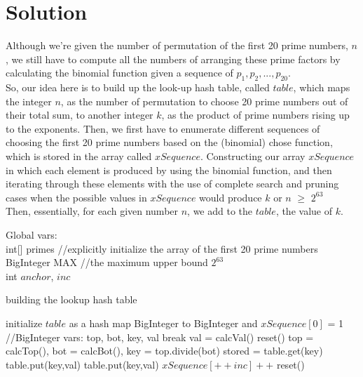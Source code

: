 \documentclass[12pt]{article}
\begin{document}
  \section{Solution}
	Although we're given the number of permutation of the first 20 prime numbers, $n$, we still have to compute all the numbers of arranging these prime factors by calculating the binomial function given a sequence of $p_1, p_2, ... , p_20$. \\
	So, our idea here is to build up the look-up hash table, called $table$, which maps the integer $n$, as the number of permutation to choose 20 prime numbers out of their total sum, to another integer $k$, as the product of prime numbers rising up to the exponents.
	Then, we first have to enumerate different sequences of choosing the first 20 prime numbers based on the (binomial) chose function, which is stored in the array called $xSequence$. Constructing our array $xSequence$  in which each element is produced by using the binomial function, and then iterating through these elements with the use of complete search and pruning cases when the possible values in $xSequence$ would produce $k$ or $n$ $\geq$ $2^{63}$  \\
	Then, essentially, for each given number $n$, we add to the $table$, the value of $k$.

	Global vars: \\
	int[] primes //explicitly initialize the array of the first 20 prime numbers \\
	BigInteger MAX //the maximum upper bound $2^{63}$\\
	int $anchor$, $inc$ \\

\begin{algorithm}[H]
\caption{building the lookup hash table}
\begin{algorithmic}
   	\State initialize $table$ as a hash map BigInteger to BigInteger and $xSequence[0]$ = 1
					//BigInteger vars: top, bot, key, val
			\State break
		\EndIf
			\State val = calcVal()
				\State reset()
			\EndIf
			\State top = calcTop(), bot = calcBot(), key = top.divide(bot)
				\State stored = table.get(key)
					\State table.put(key,val)
				\EndIf
			\Else
				\State table.put(key,val)
			\EndIf
				 \State $xSequence[++inc]++$
			\Else
				\State reset()
			\EndIf
		\EndIf
	\EndWhile
    \EndProcedure
\end{algorithmic}
\end{algorithm}
\end{document}

